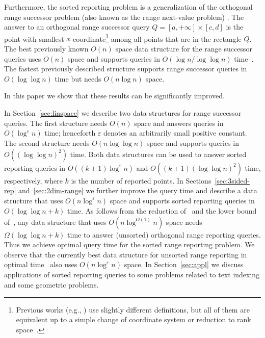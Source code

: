 \documentclass[11pt]{article}
\newcommand{\no}[1]{}
\newcommand{\nono}[1]{}
\newcommand{\eps}{\varepsilon}
\begin{document}
Furthermore, the sorted reporting problem is a generalization of the 
orthogonal range successor problem (also known as the range next-value problem) \cite{LenhofS94,CrochemoreIR07,KKL07wads,IliopoulosCKRW08,Yu:2011}. 
The answer to an orthogonal range successor query $Q=[a,+\infty]\times [c,d]$ 
is the point with smallest $x$-coordinate\footnote{Previous works (e.g., \cite{CrochemoreIR07,Yu:2011}) use slightly different definitions, but all of them are equivalent up to a simple change of coordinate system or reduction to rank space~\cite{GabowBT84}.} among all points that are 
in the rectangle $Q$. The best previously known $O(n)$ space  data structure 
for the range 
successor queries uses $O(n)$ space and supports queries in
 $O(\log n/\log \log n)$ time~\cite{Yu:2011}. The fastest previously described 
structure  supports range successor queries in $O(\log \log n)$ 
time but needs $O(n\log n)$ space. 
\no{
A data structure that answers range successor queries in time $f(n)$ can also 
answer sorted reporting queries in $O((k+1) f(n))$ time; see the proof of Theorem~\ref{theor:spaceeff}.
Thus the linear space structure of~\cite{Yu:2011} answers queries in $O((k+1)(\log n/\log \log n))$ time.}
 In this paper we show that these results can be significantly improved. 


In Section~\ref{sec:linspace} we describe two data structures for range 
successor queries.  The first structure needs $O(n)$ space and answers 
 queries in $O(\log^{\eps} n)$ time; henceforth $\eps$ denotes an arbitrarily small positive constant. The second structure  needs 
$O(n\log \log n)$ space and supports  queries in $O((\log\log n)^2)$ 
time. Both data structures can be used to answer sorted reporting queries 
in $O((k+1)\log^{\eps}n)$ and $O((k+1)(\log\log n)^2)$ time, respectively, where $k$ is the number of reported points.
In Sections~\ref{sec:3sided-rep} and~\ref{sec:2dim-range} we further improve the query time and describe a data 
structure that uses $O(n\log^{\eps} n)$ space and supports sorted reporting 
queries in $O(\log \log n + k)$ time.  As follows from the reduction of~\cite{MNSW98} and the lower bound of~\cite{PT06}, any data structure that uses $O(n\log^{O(1)}n)$ space needs 
$\Omega(\log \log n+ k)$ time to answer  (unsorted) orthogonal range reporting queries. Thus we achieve optimal query time for the sorted range reporting 
problem.  We observe that the currently best data structure 
for unsorted range reporting in optimal time~\cite{ChanLP11} also 
uses $O(n\log^{\eps} n)$ space.
In Section~\ref{sec:appl} we discuss applications of sorted reporting queries to some problems related to text indexing and some geometric problems. 
\nono{Further applications are described in the full version of this paper~\cite{NN12full}.}
\end{document}
